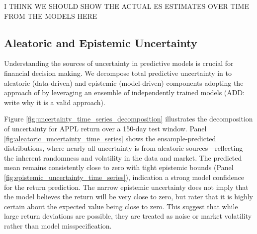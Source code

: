 I THINK WE SHOULD SHOW THE ACTUAL ES ESTIMATES OVER TIME FROM THE MODELS HERE

\subsection{Aleatoric and Epistemic Uncertainty}
\label{sec:aleatoric_and_epistemic_uncertainty}


Understanding the sources of uncertainty in predictive models is crucial for financial decision making. We decompose total predictive uncertainty in to aleatoric (data-driven) and epistemic (model-driven) components adopting the approach of \textcite{Berry2023decomposeALandEP} by leveraging an ensemble of independently trained models (ADD: write why it is a valid approach).

Figure \ref{fig:uncertainty_time_series_decomposition} illustrates the decomposition of uncertainty for APPL return over a 150-day test window. Panel \ref{fig:aleatoric_uncertainty_time_series} shows the ensample-predicted distributions, where nearly all uncertainty is from aleatoric sources—reflecting the inherent randomness and volatility in the data and market. The predicted mean remains consistently close to zero with tight epistemic bounds (Panel \ref{fig:epistemic_uncertainty_time_series}), indication a strong model confidence for the return prediction. The narrow epistemic uncertainty does not imply that the model believes the return will be very close to zero, but rater that it is highly certain about the expected value being close to zero. This suggest that while large return deviations are possible, they are treated as noise or market volatility rather than model misspecification. 

